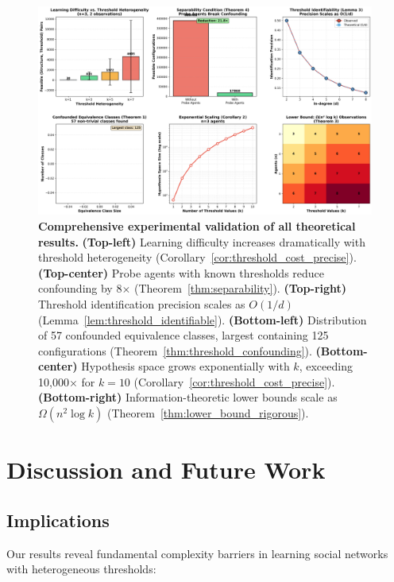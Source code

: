 \documentclass[11pt]{article}
\begin{document}
\begin{figure}[t]
\centering
\includegraphics[width=0.99\textwidth]{comprehensive_validation.png}
\caption{\textbf{Comprehensive experimental validation of all theoretical results.} \textbf{(Top-left)} Learning difficulty increases dramatically with threshold heterogeneity (Corollary~\ref{cor:threshold_cost_precise}). \textbf{(Top-center)} Probe agents with known thresholds reduce confounding by 8$\times$ (Theorem~\ref{thm:separability}). \textbf{(Top-right)} Threshold identification precision scales as $O(1/d)$ (Lemma~\ref{lem:threshold_identifiable}). \textbf{(Bottom-left)} Distribution of 57 confounded equivalence classes, largest containing 125 configurations (Theorem~\ref{thm:threshold_confounding}). \textbf{(Bottom-center)} Hypothesis space grows exponentially with $k$, exceeding 10,000$\times$ for $k=10$ (Corollary~\ref{cor:threshold_cost_precise}). \textbf{(Bottom-right)} Information-theoretic lower bounds scale as $\Omega(n^2 \log k)$ (Theorem~\ref{thm:lower_bound_rigorous}).}
\label{fig:comprehensive}
\end{figure}

\section{Discussion and Future Work}
\label{sec:discussion}

\subsection{Implications}

Our results reveal fundamental complexity barriers in learning social networks with heterogeneous thresholds:
\end{document}
